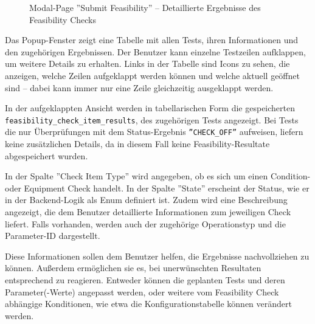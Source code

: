 \begin{figure}[!htbp] 
    \centering 
    \caption{Modal-Page ''Submit Feasibility'' – Detaillierte Ergebnisse des Feasibility Checks} 
    \label{fig:result-details} 
\end{figure}

Das Popup-Fenster zeigt eine Tabelle mit allen Tests, ihren Informationen und den zugehörigen Ergebnissen. Der Benutzer kann einzelne Testzeilen aufklappen, um weitere Details zu erhalten. Links in der Tabelle sind Icons zu sehen, die anzeigen, welche Zeilen aufgeklappt werden können und welche aktuell geöffnet sind – dabei kann immer nur eine Zeile gleichzeitig ausgeklappt werden. 

In der aufgeklappten Ansicht werden in tabellarischen Form die gespeicherten \texttt{feasibility\_check\_item\_results}, des zugehörigen Tests angezeigt. Bei Tests die nur Überprüfungen mit dem Status-Ergebnis \texttt{''CHECK\_OFF''} aufweisen, liefern keine zusätzlichen Details, da in diesem Fall keine Feasibility-Resultate abgespeichert wurden. 

In der Spalte ''Check Item Type'' wird angegeben, ob es sich um einen Condition- oder Equipment Check handelt. In der Spalte ''State'' erscheint der Status, wie er in der Backend-Logik als Enum definiert ist. Zudem wird eine Beschreibung angezeigt, die dem Benutzer detaillierte Informationen zum jeweiligen Check liefert. Falls vorhanden, werden auch der zugehörige Operationstyp und die Parameter-ID dargestellt.

Diese Informationen sollen dem Benutzer helfen, die Ergebnisse nachvollziehen zu können. Außerdem ermöglichen sie es, bei unerwünschten Resultaten entsprechend zu reagieren. Entweder können die geplanten Tests und deren Parameter(-Werte) angepasst werden, oder weitere vom Feasibility Check abhängige Konditionen, wie etwa die Konfigurationstabelle können verändert werden.



